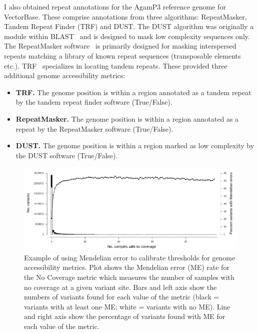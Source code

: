 \documentclass[a4paper,11pt,abstracton,hidelinks]{scrartcl}
\begin{document}
I also obtained repeat annotations for the AgamP3 reference genome for VectorBase.
%
These comprise annotations from three algorithms: RepeatMasker, Tandem Repeat Finder (TRF) and DUST.
%
The DUST algorithm was originally a module within BLAST~\parencite{Altschul1990} and is designed to mask low complexity sequences only.
%
The RepeatMasker software~\parencite{Smit2013} is primarily designed for masking interspersed repeats matching a library of known repeat sequences (transposable elements etc.).
%
TRF~\parencite{Benson1999} specializes in locating tandem repeats.
%
These provided three additional genome accessibility metrics:
%
\begin{itemize}
%
\item \textbf{TRF.} The genome position is within a region annotated as a tandem repeat by the tandem repeat finder software (True/False).
%
\item \textbf{RepeatMasker.} The genome position is within a region annotated as a repeat by the RepeatMasker software (True/False).
%
\item \textbf{DUST.} The genome position is within a region marked as low complexity by the DUST software (True/False).
%
\end{itemize}


\begin{figure}[t!]
\centering
\includegraphics[width=\textwidth]{artwork/chapter3/me_nodp.pdf}
\caption{Example of using Mendelian error to calibrate thresholds for genome accessibility metrics.
%
Plot shows the Mendelian error (ME) rate for the No Coverage metric which measures the number of samples with no coverage at a given variant site.
%
Bars and left axis show the numbers of variants found for each value of the metric (black = variants with at least one ME; white = variants with no ME).
%
Line and right axis show the percentage of variants found with ME for each value of the metric.
%
}
%
\label{fig:me_nodp}
\end{figure}
\end{document}
